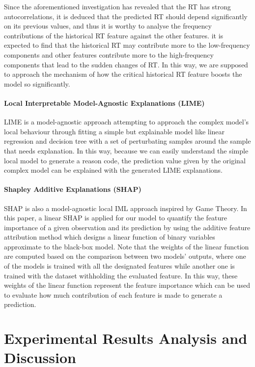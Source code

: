 \documentclass[11pt]{article}
\begin{document}
    Since the aforementioned investigation has revealed that the RT has strong autocorrelations, it is deduced that the predicted RT should depend significantly on its previous values, and thus it is worthy to analyse the frequency contributions of the historical RT feature against the other features. it is expected to find that the historical RT may contribute more to the low-frequency components and other features contribute more to the high-frequency components that lead to the sudden changes of RT. In this way, we are supposed to approach the mechanism of how the critical historical RT feature boosts the model so significantly.
    
    \paragraph{Local Interpretable Model-Agnostic Explanations (LIME)}
    LIME\citep{ribeiro2016should} is a model-agnostic approach attempting to approach the complex model’s local behaviour through fitting a simple but explainable model like linear regression and decision tree with a set of perturbating samples around the sample that needs explanation. In this way, because we can easily understand the simple local model to generate a reason code, the prediction value given by the original complex model can be explained with the generated LIME explanations.
    
    \paragraph{Shapley Additive Explanations (SHAP)}
    SHAP\citep{lundberg2017unified} is also a model-agnostic local IML approach inspired by Game Theory\citep{myerson2013game}. In this paper, a linear SHAP is applied for our model to quantify the feature importance of a given observation and its prediction by using the additive feature attribution method which designs a linear function of binary variables approximate to the black-box model. Note that the weights of the linear function are computed based on the comparison between two models’ outputs, where one of the models is trained with all the designated features while another one is trained with the dataset withholding the evaluated feature. In this way, these weights of the linear function represent the feature importance which can be used to evaluate how much contribution of each feature is made to generate a prediction.

\section{Experimental Results Analysis and Discussion}
\end{document}
